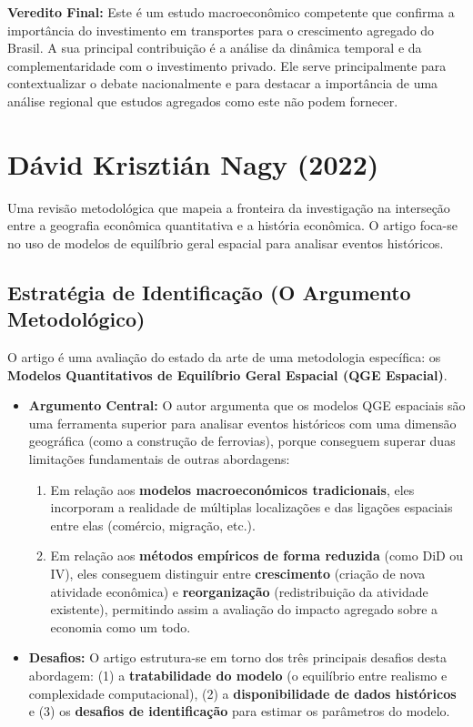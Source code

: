 \documentclass[12pt, a4paper]{article}
\begin{document}
\noindent\textbf{Veredito Final:} Este é um estudo macroeconômico competente que confirma a importância do investimento em transportes para o crescimento agregado do Brasil. A sua principal contribuição é a análise da dinâmica temporal e da complementaridade com o investimento privado. Ele serve principalmente para contextualizar o debate nacionalmente e para destacar a importância de uma análise regional que estudos agregados como este não podem fornecer.

\section{Dávid Krisztián Nagy (2022)}
Uma revisão metodológica que mapeia a fronteira da investigação na interseção entre a geografia econômica quantitativa e a história econômica. O artigo foca-se no uso de modelos de equilíbrio geral espacial para analisar eventos históricos.

\subsection{Estratégia de Identificação (O Argumento Metodológico)}
O artigo é uma avaliação do estado da arte de uma metodologia específica: os \textbf{Modelos Quantitativos de Equilíbrio Geral Espacial (QGE Espacial)}.

\begin{itemize}
    \item \textbf{Argumento Central:} O autor argumenta que os modelos QGE espaciais são uma ferramenta superior para analisar eventos históricos com uma dimensão geográfica (como a construção de ferrovias), porque conseguem superar duas limitações fundamentais de outras abordagens:
        \begin{enumerate}
            \item Em relação aos \textbf{modelos macroeconómicos tradicionais}, eles incorporam a realidade de múltiplas localizações e das ligações espaciais entre elas (comércio, migração, etc.).
            \item Em relação aos \textbf{métodos empíricos de forma reduzida} (como DiD ou IV), eles conseguem distinguir entre \textbf{crescimento} (criação de nova atividade econômica) e \textbf{reorganização} (redistribuição da atividade existente), permitindo assim a avaliação do impacto agregado sobre a economia como um todo.
        \end{enumerate}
    \item \textbf{Desafios:} O artigo estrutura-se em torno dos três principais desafios desta abordagem: (1) a \textbf{tratabilidade do modelo} (o equilíbrio entre realismo e complexidade computacional), (2) a \textbf{disponibilidade de dados históricos} e (3) os \textbf{desafios de identificação} para estimar os parâmetros do modelo.
\end{itemize}
\end{document}
